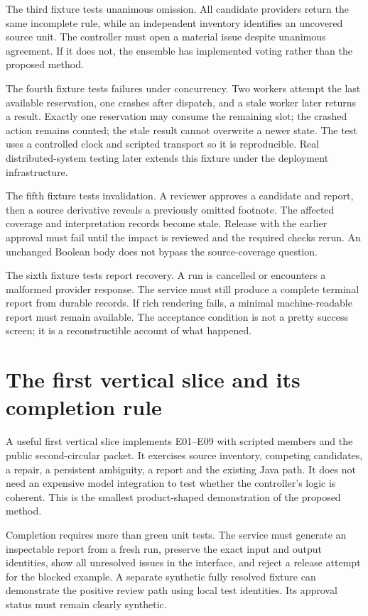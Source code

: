 The third fixture tests unanimous omission. All candidate providers return the
same incomplete rule, while an independent inventory identifies an uncovered
source unit. The controller must open a material issue despite unanimous agreement.
If it does not, the ensemble has implemented voting rather than the proposed
method.

The fourth fixture tests failures under concurrency. Two workers attempt the last
available reservation, one crashes after dispatch, and a stale worker later
returns a result. Exactly one reservation may consume the remaining slot; the
crashed action remains counted; the stale result cannot overwrite a newer state.
The test uses a controlled clock and scripted transport so it is reproducible.
Real distributed-system testing later extends this fixture under the deployment
infrastructure.

The fifth fixture tests invalidation. A reviewer approves a candidate and report,
then a source derivative reveals a previously omitted footnote. The affected
coverage and interpretation records become stale. Release with the earlier
approval must fail until the impact is reviewed and the required checks rerun.
An unchanged Boolean body does not bypass the source-coverage question.

The sixth fixture tests report recovery. A run is cancelled or encounters a
malformed provider response. The service must still produce a complete terminal
report from durable records. If rich rendering fails, a minimal machine-readable
report must remain available. The acceptance condition is not a pretty success
screen; it is a reconstructible account of what happened.

\section{The first vertical slice and its completion rule}
\label{merge:M08:13}


A useful first vertical slice implements E01--E09 with scripted members and the
public second-circular packet. It exercises source inventory, competing candidates,
a repair, a persistent ambiguity, a report and the existing Java path. It does
not need an expensive model integration to test whether the controller's logic
is coherent. This is the smallest product-shaped demonstration of the proposed
method.

Completion requires more than green unit tests. The service must generate an
inspectable report from a fresh run, preserve the exact input and output identities,
show all unresolved issues in the interface, and reject a release attempt for the
blocked example. A separate synthetic fully resolved fixture can demonstrate the
positive review path using local test identities. Its approval status must remain
clearly synthetic.

